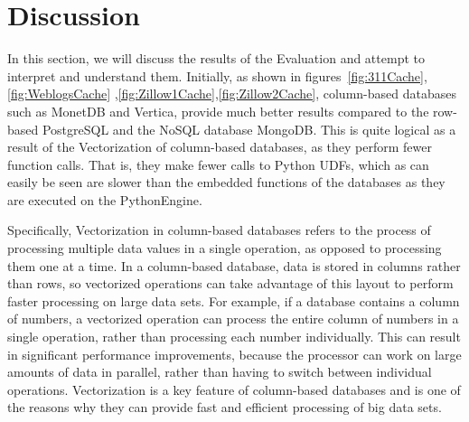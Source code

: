 \section{Discussion}
\label{sec:discussion}



In this section, we will discuss the results of the Evaluation and attempt to interpret and 
understand them. Initially, as shown in figures~\ref{fig:311Cache},\ref{fig:WeblogsCache}
,\ref{fig:Zillow1Cache},\ref{fig:Zillow2Cache}, column-based databases such as MonetDB and 
Vertica, provide much better results compared to the row-based PostgreSQL and the NoSQL 
database MongoDB. This is quite logical as a result of the Vectorization of column-based 
databases, as they perform fewer function calls. That is, they make fewer calls to Python UDFs, 
which as can easily be seen are slower than the embedded functions of the databases as they 
are executed on the PythonEngine.

Specifically, Vectorization in column-based databases refers to the process of processing 
multiple data values in a single operation, as opposed to processing them one at a time. 
In a column-based database, data is stored in columns rather than rows, so vectorized 
operations can take advantage of this layout to perform faster processing on large data 
sets. For example, if a database contains a column of numbers, a vectorized operation 
can process the entire column of numbers in a single operation, rather than processing each 
number individually. This can result in significant performance improvements, because the 
processor can work on large amounts of data in parallel, rather than having to switch between 
individual operations. Vectorization is a key feature of column-based databases and is one of 
the reasons why they can provide fast and efficient processing of big data sets.


